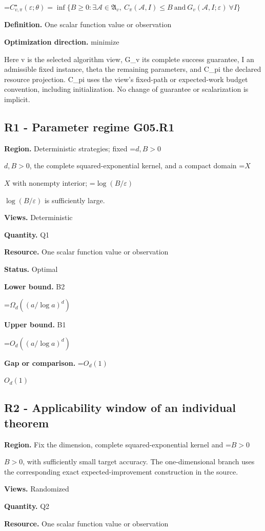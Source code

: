 \documentclass[10pt,a4paper]{article}
\newcommand{\AtlasMath}[1]{\par\begingroup\centering\setbox0=\hbox{$\displaystyle #1$}\ifdim\wd0>1.4\linewidth\typeout{ATLAS WIDE FORMULA: \the\wd0}\fi\ifdim\wd0>\linewidth\resizebox{\linewidth}{!}{\box0}\else\box0\fi\par\endgroup}
\newcommand{\AtlasInlineMath}[1]{\begingroup\setbox0=\hbox{$#1$}\ifdim\wd0>.4\linewidth\endgroup\AtlasMath{#1}\else\endgroup$#1$\fi}
\begin{document}
\AtlasMath{C^\star_{v,\pi}(\varepsilon;\theta)=\inf\{B\ge0:\exists\mathcal A\in\mathfrak A_v,\ C_\pi(\mathcal A,I)\le B\ \text{and}\ G_v(\mathcal A,I;\varepsilon)\ \forall I\}}
\textbf{Definition.} One scalar function value or observation

\textbf{Optimization direction.} minimize

Here v is the selected algorithm view, G\_v its complete success guarantee, I an admissible fixed instance, theta the remaining parameters, and C\_pi the declared resource projection. C\_pi uses the view's fixed-path or expected-work budget convention, including initialization. No change of guarantee or scalarization is implicit.

\subsection{R1 - Parameter regime G05.R1}
\textbf{Region.} Deterministic strategies; fixed \AtlasInlineMath{d,B>0}, the complete squared-exponential kernel, and a compact domain \AtlasInlineMath{X} with nonempty interior; \AtlasInlineMath{\log(B/\varepsilon)} is sufficiently large.

\textbf{Views.} Deterministic

\textbf{Quantity.} Q1

\textbf{Resource.} One scalar function value or observation

\textbf{Status.} Optimal

\textbf{Lower bound.} B2

\AtlasMath{\Omega_d((a/\log a)^d)}
\textbf{Upper bound.} B1

\AtlasMath{O_d((a/\log a)^d)}
\textbf{Gap or comparison.} \AtlasInlineMath{O_d(1)}

\subsection{R2 - Applicability window of an individual theorem}
\textbf{Region.} Fix the dimension, complete squared-exponential kernel and \AtlasInlineMath{B>0}, with sufficiently small target accuracy. The one-dimensional branch uses the corresponding exact expected-improvement construction in the source.

\textbf{Views.} Randomized

\textbf{Quantity.} Q2

\textbf{Resource.} One scalar function value or observation
\end{document}
